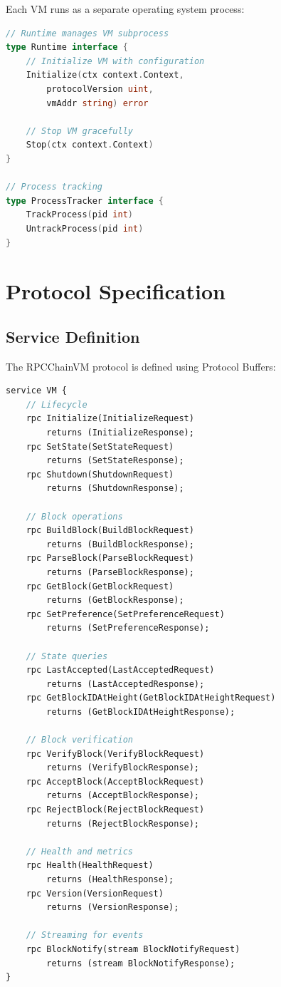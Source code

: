 \documentclass[11pt,letterpaper]{article}
\begin{document}
Each VM runs as a separate operating system process:

\begin{lstlisting}[language=Go, caption=VM Process Lifecycle]
// Runtime manages VM subprocess
type Runtime interface {
    // Initialize VM with configuration
    Initialize(ctx context.Context,
        protocolVersion uint,
        vmAddr string) error

    // Stop VM gracefully
    Stop(ctx context.Context)
}

// Process tracking
type ProcessTracker interface {
    TrackProcess(pid int)
    UntrackProcess(pid int)
}
\end{lstlisting}

\section{Protocol Specification}

\subsection{Service Definition}

The RPCChainVM protocol is defined using Protocol Buffers:

\begin{lstlisting}[language=protobuf, caption=VM Service Definition]
service VM {
    // Lifecycle
    rpc Initialize(InitializeRequest)
        returns (InitializeResponse);
    rpc SetState(SetStateRequest)
        returns (SetStateResponse);
    rpc Shutdown(ShutdownRequest)
        returns (ShutdownResponse);

    // Block operations
    rpc BuildBlock(BuildBlockRequest)
        returns (BuildBlockResponse);
    rpc ParseBlock(ParseBlockRequest)
        returns (ParseBlockResponse);
    rpc GetBlock(GetBlockRequest)
        returns (GetBlockResponse);
    rpc SetPreference(SetPreferenceRequest)
        returns (SetPreferenceResponse);

    // State queries
    rpc LastAccepted(LastAcceptedRequest)
        returns (LastAcceptedResponse);
    rpc GetBlockIDAtHeight(GetBlockIDAtHeightRequest)
        returns (GetBlockIDAtHeightResponse);

    // Block verification
    rpc VerifyBlock(VerifyBlockRequest)
        returns (VerifyBlockResponse);
    rpc AcceptBlock(AcceptBlockRequest)
        returns (AcceptBlockResponse);
    rpc RejectBlock(RejectBlockRequest)
        returns (RejectBlockResponse);

    // Health and metrics
    rpc Health(HealthRequest)
        returns (HealthResponse);
    rpc Version(VersionRequest)
        returns (VersionResponse);

    // Streaming for events
    rpc BlockNotify(stream BlockNotifyRequest)
        returns (stream BlockNotifyResponse);
}
\end{lstlisting}
\end{document}

